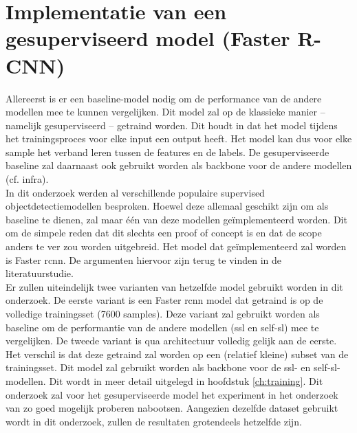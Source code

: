 \section{Implementatie van een gesuperviseerd model (Faster R-CNN)}

Allereerst is er een baseline-model nodig om de performance van de andere modellen mee te kunnen vergelijken. Dit model zal op de klassieke manier -- namelijk gesuperviseerd -- getraind worden. Dit houdt in dat het model tijdens het trainingsproces voor elke input een output heeft. Het model kan dus voor elke sample het verband leren tussen de features en de labels. De gesuperviseerde baseline zal daarnaast ook gebruikt worden als backbone voor de andere modellen (cf. infra). \\

In dit onderzoek werden al verschillende populaire supervised objectdetectiemodellen besproken. Hoewel deze allemaal geschikt zijn om als baseline te dienen, zal maar één van deze modellen geïmplementeerd worden. Dit om de simpele reden dat dit slechts een proof of concept is en dat de scope anders te ver zou worden uitgebreid. Het model dat geïmplementeerd zal worden is Faster \gls{rcnn}. De argumenten hiervoor zijn terug te vinden in %
de literatuurstudie. \\

Er zullen uiteindelijk twee varianten van hetzelfde model gebruikt worden in dit onderzoek. De eerste variant is een Faster \gls{rcnn} model dat getraind is op de volledige trainingsset (7600 samples). Deze variant zal gebruikt worden als baseline om de performantie van de andere modellen (\gls{ssl} en \gls{self-sl}) mee te vergelijken. De tweede variant is qua architectuur volledig gelijk aan de eerste. Het verschil is dat deze getraind zal worden op een (relatief kleine) subset van de trainingsset. Dit model zal gebruikt worden als backbone voor de \gls{ssl}- en \gls{self-sl}-modellen. Dit wordt in meer detail uitgelegd in hoofdstuk \ref{ch:training}. Dit onderzoek zal voor het gesuperviseerde model het experiment in het onderzoek van \textcite{Xie_2022} zo goed mogelijk proberen nabootsen. Aangezien dezelfde dataset gebruikt wordt in dit onderzoek, zullen de resultaten grotendeels hetzelfde zijn.

